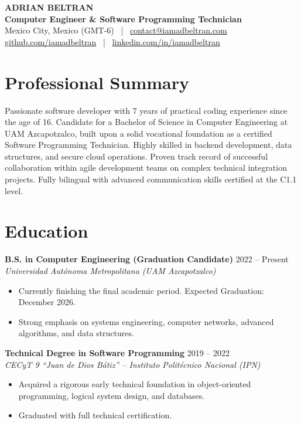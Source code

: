 \documentclass[10pt,a4paper]{article}
\begin{document}
\begin{center}
    {\Huge \textbf{ADRIAN BELTRAN}} \\
    \vspace{4pt}
    {\large \textbf{Computer Engineer \& Software Programming Technician}} \\
    \vspace{4pt}
    Mexico City, Mexico (GMT-6) \ | \ \href{mailto:contact@iamadbeltran.com}{contact@iamadbeltran.com} \\
    \href{https://github.com/iamadbeltran}{github.com/iamadbeltran} \ | \ \href{https://linkedin.com/in/iamadbeltran}{linkedin.com/in/iamadbeltran}
\end{center}

\vspace{6pt}

\section{Professional Summary}
Passionate software developer with 7 years of practical coding experience since the age of 16. Candidate for a Bachelor of Science in Computer Engineering at UAM Azcapotzalco, built upon a solid vocational foundation as a certified Software Programming Technician. Highly skilled in backend development, data structures, and secure cloud operations. Proven track record of successful collaboration within agile development teams on complex technical integration projects. Fully bilingual with advanced communication skills certified at the C1.1 level.

\section{Education}
\noindent
\textbf{B.S. in Computer Engineering (Graduation Candidate)} \hfill 2022 -- Present \\
\textit{Universidad Autónoma Metropolitana (UAM Azcapotzalco)} \\
\begin{itemize}
    \item Currently finishing the final academic period. Expected Graduation: December 2026.
    \item Strong emphasis on systems engineering, computer networks, advanced algorithms, and data structures.
\end{itemize}

\vspace{6pt}
\noindent
\textbf{Technical Degree in Software Programming} \hfill 2019 -- 2022 \\
\textit{CECyT 9 ``Juan de Dios Bátiz'' -- Instituto Politécnico Nacional (IPN)} \\
\begin{itemize}
    \item Acquired a rigorous early technical foundation in object-oriented programming, logical system design, and databases.
    \item Graduated with full technical certification.
\end{itemize}
\end{document}
